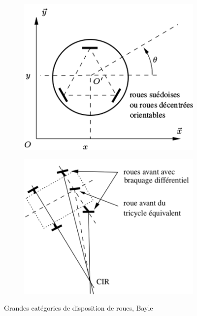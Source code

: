 \begin{figure}[!h]
\begin{subfigure}{0.225\linewidth}
                    \label{fig:bot_roue-b}
                    \end{subfigure}
                    \begin{subfigure}{0.225\linewidth}
                    \includegraphics[width=\linewidth]{Figures/Bayle-type_de_roue-c}
                    \label{fig:bot_roue-c}
                    \end{subfigure}
                    \begin{subfigure}{0.235\linewidth}\raggedright
                    \includegraphics[width=\linewidth]{Figures/Bayle-type_de_roue-d}
                    \label{fig:bot_roue-d}
                    \end{subfigure}
                    \caption[Robot à roues, Bayle~]{Grandes catégories de disposition de roues, Bayle~}\label{fig:bot_roue}
                \end{figure}\par%
